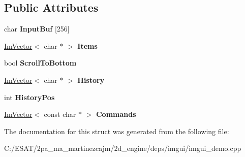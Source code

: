 \subsection*{Public Attributes}
\begin{DoxyCompactItemize}
\item 
\mbox{\label{struct_example_app_console_ab30accde81ae6833bd2ecf35f43f01ab}} 
char {\bfseries Input\+Buf} \mbox{[}256\mbox{]}
\item 
\mbox{\label{struct_example_app_console_acfde7d45fb733ac72d5d500168557b36}} 
\hyperlink{class_im_vector}{Im\+Vector}$<$ char $\ast$ $>$ {\bfseries Items}
\item 
\mbox{\label{struct_example_app_console_a69b1406795fd71a3757761b0767ea1c5}} 
bool {\bfseries Scroll\+To\+Bottom}
\item 
\mbox{\label{struct_example_app_console_a11c7fa54e744288f3606e4d6521d6345}} 
\hyperlink{class_im_vector}{Im\+Vector}$<$ char $\ast$ $>$ {\bfseries History}
\item 
\mbox{\label{struct_example_app_console_a2508db0a7d205947cea65b141d4ed589}} 
int {\bfseries History\+Pos}
\item 
\mbox{\label{struct_example_app_console_a1eebee69cceb0345cf9d9b6e6beb9d03}} 
\hyperlink{class_im_vector}{Im\+Vector}$<$ const char $\ast$ $>$ {\bfseries Commands}
\end{DoxyCompactItemize}


The documentation for this struct was generated from the following file\+:\begin{DoxyCompactItemize}
\item 
C\+:/\+E\+S\+A\+T/2pa\+\_\+ma\+\_\+martinezcajm/2d\+\_\+engine/deps/imgui/imgui\+\_\+demo.\+cpp\end{DoxyCompactItemize}
